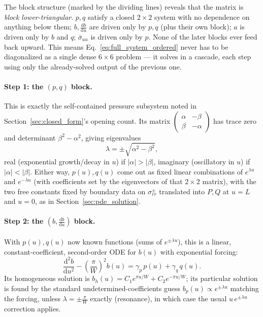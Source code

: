 \documentclass[11pt]{article}
\begin{document}
The block structure (marked by the dividing lines) reveals that the matrix is \emph{block lower-triangular}. $p,q$ satisfy a closed $2\times2$ system with no dependence on anything below them; $b,\frac{\mathrm db}{\mathrm du}$ are driven only by $p,q$ (plus their own block); $a$ is driven only by $b$ and $q$; $\bar\sigma_{uu}$ is driven only by $p$. None of the later blocks ever feed back upward. This means Eq.~\eqref{eq:full_system_ordered} never has to be diagonalized as a single dense $6\times6$ problem --- it solves in a cascade, each step using only the already-solved output of the previous one.

\paragraph{Step 1: the $(p,q)$ block.} This is exactly the self-contained pressure subsystem noted in Section~\ref{sec:closed_form}'s opening count. Its matrix $\begin{pmatrix}\alpha&-\beta\\\beta&-\alpha\end{pmatrix}$ has trace zero and determinant $\beta^2-\alpha^2$, giving eigenvalues
\begin{equation}\label{eq:pq_eigenvalues}
    \lambda = \pm\sqrt{\alpha^2-\beta^2},
\end{equation}
real (exponential growth/decay in $u$) if $|\alpha|>|\beta|$, imaginary (oscillatory in $u$) if $|\alpha|<|\beta|$. Either way, $p(u),q(u)$ come out as fixed linear combinations of $e^{\lambda u}$ and $e^{-\lambda u}$ (with coefficients set by the eigenvectors of that $2\times2$ matrix), with the two free constants fixed by boundary data on $\sigma_{rr}^\pm$ translated into $P,Q$ at $u=L$ and $u=0$, as in Section~\ref{sec:pde_solution}.

\paragraph{Step 2: the $(b,\frac{\mathrm db}{\mathrm du})$ block.} With $p(u),q(u)$ now known functions (sums of $e^{\pm\lambda u}$), this is a linear, constant-coefficient, second-order ODE for $b(u)$ with exponential forcing:
\begin{equation}\label{eq:b_forced}
    \frac{\mathrm d^2b}{\mathrm du^2} - \left(\frac{\pi}{W}\right)^2 b(u) = \gamma_p\,p(u) + \gamma_q\,q(u).
\end{equation}
Its homogeneous solution is $b_h(u)=C_1e^{\pi u/W}+C_2e^{-\pi u/W}$; its particular solution is found by the standard undetermined-coefficients guess $b_p(u)\propto e^{\pm\lambda u}$ matching the forcing, unless $\lambda=\pm\frac\pi W$ exactly (resonance), in which case the usual $u\,e^{\pm\lambda u}$ correction applies.
\end{document}
